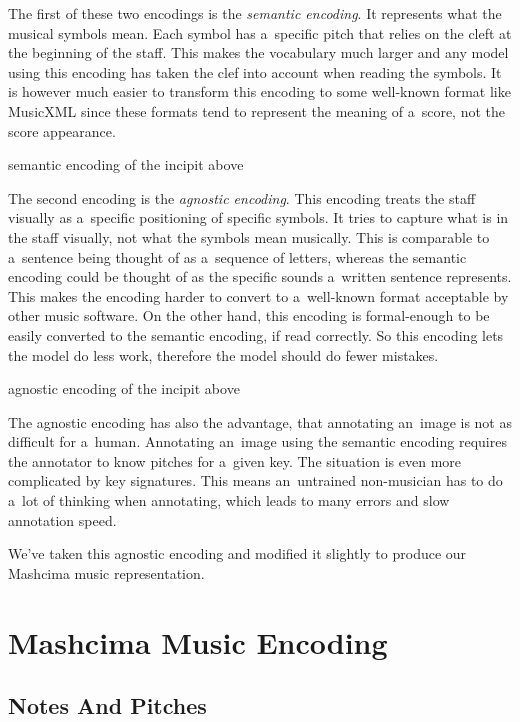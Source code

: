 The first of these two encodings is the \emph{semantic encoding}. It represents what the musical symbols mean. Each symbol has a~specific pitch that relies on the cleft at the beginning of the staff. This makes the vocabulary much larger and any model using this encoding has taken the clef into account when reading the symbols. It is however much easier to transform this encoding to some well-known format like MusicXML since these formats tend to represent the meaning of a~score, not the score appearance.

\begin{code}
semantic encoding of the incipit above
\end{code}

The second encoding is the \emph{agnostic encoding}. This encoding treats the staff visually as a~specific positioning of specific symbols. It tries to capture what is in the staff visually, not what the symbols mean musically. This is comparable to a~sentence being thought of as a~sequence of letters, whereas the semantic encoding could be thought of as the specific sounds a~written sentence represents. This makes the encoding harder to convert to a~well-known format acceptable by other music software. On the other hand, this encoding is formal-enough to be easily converted to the semantic encoding, if read correctly. So this encoding lets the model do less work, therefore the model should do fewer mistakes.

\begin{code}
agnostic encoding of the incipit above
\end{code}

The agnostic encoding has also the advantage, that annotating an~image is not as difficult for a~human. Annotating an~image using the semantic encoding requires the annotator to know pitches for a~given key. The situation is even more complicated by key signatures. This means an~untrained non-musician has to do a~lot of thinking when annotating, which leads to many errors and slow annotation speed.

We've taken this agnostic encoding and modified it slightly to produce our Mashcima music representation.


\section{Mashcima Music Encoding}


\subsection{Notes And Pitches}

